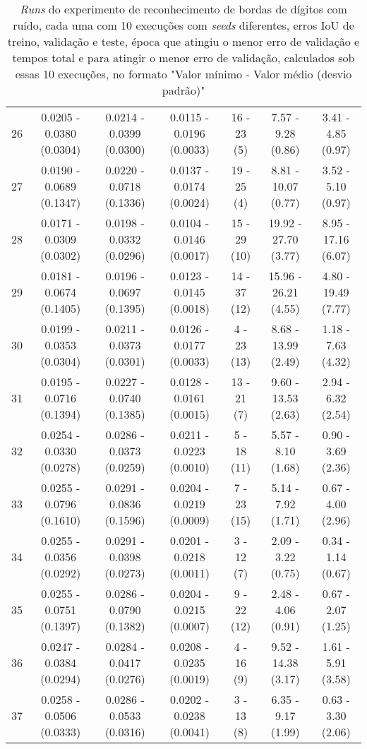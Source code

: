 \begin{table}[ht]
{\begin{tabular}{ccccccc}
            26 & 0.0205 - 0.0380 (0.0304) & 0.0214 - 0.0399 (0.0300) & 0.0115 - 0.0196 (0.0033) & 16 - 23 (5) & 7.57 - 9.28 (0.86) & 3.41 - 4.85 (0.97) \\
            27 & 0.0190 - 0.0689 (0.1347) & 0.0220 - 0.0718 (0.1336) & 0.0137 - 0.0174 (0.0024) & 19 - 25 (4) & 8.81 - 10.07 (0.77) & 3.52 - 5.10 (0.97) \\
            28 & 0.0171 - 0.0309 (0.0302) & 0.0198 - 0.0332 (0.0296) & 0.0104 - 0.0146 (0.0017) & 15 - 29 (10) & 19.92 - 27.70 (3.77) & 8.95 - 17.16 (6.07) \\
            29 & 0.0181 - 0.0674 (0.1405) & 0.0196 - 0.0697 (0.1395) & 0.0123 - 0.0145 (0.0018) & 14 - 37 (12) & 15.96 - 26.21 (4.55) & 4.80 - 19.49 (7.77) \\
            30 & 0.0199 - 0.0353 (0.0304) & 0.0211 - 0.0373 (0.0301) & 0.0126 - 0.0177 (0.0033) & 4 - 23 (13) & 8.68 - 13.99 (2.49) & 1.18 - 7.63 (4.32) \\
            31 & 0.0195 - 0.0716 (0.1394) & 0.0227 - 0.0740 (0.1385) & 0.0128 - 0.0161 (0.0015) & 13 - 21 (7) & 9.60 - 13.53 (2.63) & 2.94 - 6.32 (2.54) \\
            32 & 0.0254 - 0.0330 (0.0278) & 0.0286 - 0.0373 (0.0259) & 0.0211 - 0.0223 (0.0010) & 5 - 18 (11) & 5.57 - 8.10 (1.68) & 0.90 - 3.69 (2.36) \\
            33 & 0.0255 - 0.0796 (0.1610) & 0.0291 - 0.0836 (0.1596) & 0.0204 - 0.0219 (0.0009) & 7 - 23 (15) & 5.14 - 7.92 (1.71) & 0.67 - 4.00 (2.96) \\
            34 & 0.0255 - 0.0356 (0.0292) & 0.0291 - 0.0398 (0.0273) & 0.0201 - 0.0218 (0.0011) & 3 - 12 (7) & 2.09 - 3.22 (0.75) & 0.34 - 1.14 (0.67) \\
            35 & 0.0255 - 0.0751 (0.1397) & 0.0286 - 0.0790 (0.1382) & 0.0204 - 0.0215 (0.0007) & 9 - 22 (12) & 2.48 - 4.06 (0.91) & 0.67 - 2.07 (1.25) \\
            36 & 0.0247 - 0.0384 (0.0294) & 0.0284 - 0.0417 (0.0276) & 0.0208 - 0.0235 (0.0019) & 4 - 16 (9) & 9.52 - 14.38 (3.17) & 1.61 - 5.91 (3.58) \\
            37 & 0.0258 - 0.0506 (0.0333) & 0.0286 - 0.0533 (0.0316) & 0.0202 - 0.0238 (0.0041) & 3 - 13 (8) & 6.35 - 9.17 (1.99) & 0.63 - 3.30 (2.06) \\
            \bottomrule
        \end{tabular}
    }
     \caption[\textit{Runs} do experimento de reconhecimento de bordas de dígitos com ruído]{\textit{Runs} do experimento de reconhecimento de bordas de dígitos com ruído, cada uma com 10 execuções com \textit{seeds} diferentes, erros IoU de treino, validação e teste, época que atingiu o menor erro de validação e tempos total e para atingir o menor erro de validação,  calculados sob essas 10 execuções, no formato "Valor mínimo - Valor médio (desvio padrão)"}
    \label{tab:ap_resultados_runs_digitos}
\end{table}

